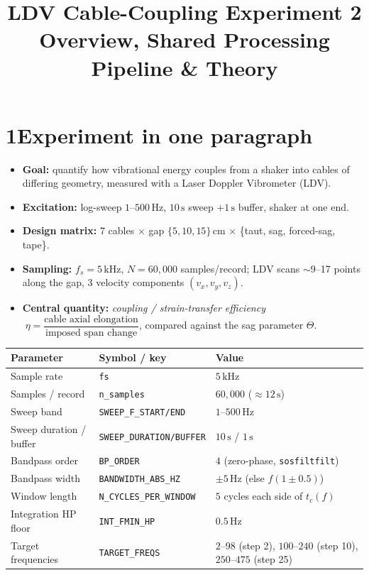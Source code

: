 \documentclass[11pt,a4paper]{article}
\title{\vspace{-1.5em}\textbf{LDV Cable-Coupling Experiment 2}\\[2pt]
\large Overview, Shared Processing Pipeline \& Theory}
\author{}\date{}
\newcommand{\unit}[1]{\,\mathrm{#1}}
\begin{document}
\maketitle\vspace{-3em}

\section*{1\quad Experiment in one paragraph}
\begin{itemize}
\item \textbf{Goal:} quantify how vibrational energy couples from a shaker into cables of differing geometry, measured with a Laser Doppler Vibrometer (LDV).
\item \textbf{Excitation:} log-sweep $1$--$500\unit{Hz}$, $10\unit{s}$ sweep $+1\unit{s}$ buffer, shaker at one end.
\item \textbf{Design matrix:} 7 cables $\times$ gap $\{5,10,15\}\unit{cm}$ $\times$ \{taut, sag, forced-sag, tape\}.
\item \textbf{Sampling:} $f_s = 5\unit{kHz}$, $N=60{,}000$ samples/record; LDV scans $\sim$9--17 points along the gap, 3 velocity components $(v_x,v_y,v_z)$.
\item \textbf{Central quantity:} \emph{coupling / strain-transfer efficiency}
$\;\eta=\dfrac{\text{cable axial elongation}}{\text{imposed span change}}$, compared against the sag parameter $\Theta$.
\end{itemize}

\begin{table}[h]\centering\footnotesize
\begin{tabular}{@{}lll@{}}
\toprule
\textbf{Parameter} & \textbf{Symbol / key} & \textbf{Value}\\\midrule
Sample rate & \texttt{fs} & $5\unit{kHz}$\\
Samples / record & \texttt{n\_samples} & $60{,}000$ ($\approx 12\unit{s}$)\\
Sweep band & \texttt{SWEEP\_F\_START/END} & $1$--$500\unit{Hz}$\\
Sweep duration / buffer & \texttt{SWEEP\_DURATION/BUFFER} & $10\unit{s}$ / $1\unit{s}$\\
Bandpass order & \texttt{BP\_ORDER} & $4$ (zero-phase, \texttt{sosfiltfilt})\\
Bandpass width & \texttt{BANDWIDTH\_ABS\_HZ} & $\pm5\unit{Hz}$ (else $f(1\pm0.5)$)\\
Window length & \texttt{N\_CYCLES\_PER\_WINDOW} & $5$ cycles each side of $t_c(f)$\\
Integration HP floor & \texttt{INT\_FMIN\_HP} & $0.5\unit{Hz}$\\
Target frequencies & \texttt{TARGET\_FREQS} & $2$--$98$ (step 2), $100$--$240$ (step 10), $250$--$475$ (step 25)\unit{Hz}\\
\bottomrule
\end{tabular}
\end{table}
\end{document}
